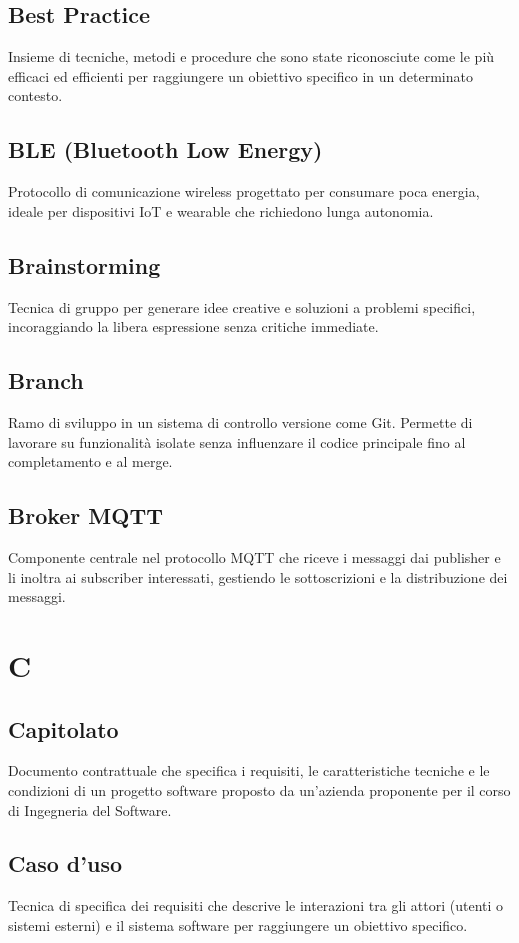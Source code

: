 \documentclass[a4paper,11pt]{article}
\begin{document}
\subsection{Best Practice}
Insieme di tecniche, metodi e procedure che sono state riconosciute come le più efficaci ed efficienti per raggiungere un obiettivo specifico in un determinato contesto.

\subsection{BLE (Bluetooth Low Energy)}
Protocollo di comunicazione wireless progettato per consumare poca energia, ideale per dispositivi IoT e wearable che richiedono lunga autonomia.

\subsection{Brainstorming}
Tecnica di gruppo per generare idee creative e soluzioni a problemi specifici, incoraggiando la libera espressione senza critiche immediate.

\subsection{Branch}
Ramo di sviluppo in un sistema di controllo versione come Git. Permette di lavorare su funzionalità isolate senza influenzare il codice principale fino al completamento e al merge.

\subsection{Broker MQTT}
Componente centrale nel protocollo MQTT che riceve i messaggi dai publisher e li inoltra ai subscriber interessati, gestiendo le sottoscrizioni e la distribuzione dei messaggi.

\newpage
\section{C}

\subsection{Capitolato}
Documento contrattuale che specifica i requisiti, le caratteristiche tecniche e le condizioni di un progetto software proposto da un'azienda proponente per il corso di Ingegneria del Software.

\subsection{Caso d'uso}
Tecnica di specifica dei requisiti che descrive le interazioni tra gli attori (utenti o sistemi esterni) e il sistema software per raggiungere un obiettivo specifico.
\end{document}
